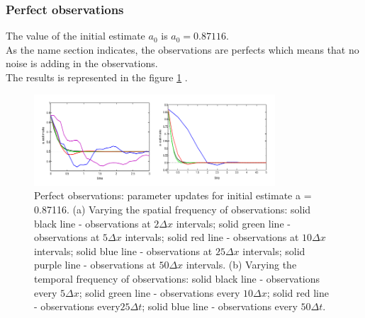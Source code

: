 \documentclass[a4,12pt]{article}
\numberwithin{equation}{section}
\begin{document}
\subsubsection{Perfect observations}
The value of the initial estimate $a_0$ is $a_0= 0.87116$. \\
As the name section indicates, the observations are perfects which means that no noise is adding in the observations. \\
The results is represented in the figure \ref{perfectObs} \cite{HybridSequential}.\\

\begin{figure}[h]
    \begin{center}
    \includegraphics[width=9cm]{../Image/perfectObsAdvection.png}
    \caption{Perfect observations: parameter updates for initial estimate a = 0.87116.
(a) Varying the spatial frequency of observations: solid black line - observations at $2\Delta x$ intervals; solid green line -
observations at $5\Delta x$ intervals; solid red line - observations at $10\Delta x$ intervals; solid blue line - observations
at $25 \Delta x$ intervals; solid purple line - observations at $50\Delta x$ intervals. (b) Varying the temporal frequency
of observations: solid black line - observations every $5\Delta x$; solid green line - observations every $10\Delta x$; solid
red line - observations every$25\Delta t$; solid blue line - observations every $50\Delta t$.}
    \label{perfectObs}
    \end{center}
\end{figure}
\end{document}

